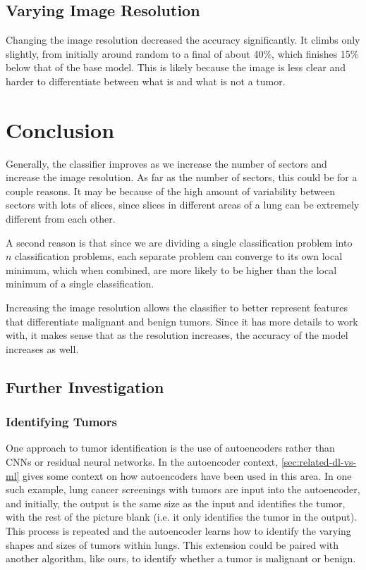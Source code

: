 \documentclass[10pt,twocolumn,letterpaper]{article}
\begin{document}
   \subsection{Varying Image Resolution} \label{sec:results-res}

		Changing the image resolution decreased the accuracy significantly. It climbs only slightly, from initially around random to a final of about 40\%, which finishes 15\% below that of the base model. This is likely because the image is less clear and harder to differentiate between what is and what is not a tumor. 

\section{Conclusion} \label{sec:conclusion}

   Generally, the classifier improves as we increase the number of sectors and increase the image resolution. As far as the number of sectors, this could be for a couple reasons. It may be because of the high amount of variability between sectors with lots of slices, since slices in different areas of a lung can be extremely different from each other. 

   A second reason is that since we are dividing a single classification problem into $n$ classification problems, each separate problem can converge to its own local minimum, which when combined, are more likely to be higher than the local minimum of a single classification. 

   Increasing the image resolution allows the classifier to better represent features that differentiate malignant and benign tumors. Since it has more details to work with, it makes sense that as the resolution increases, the accuracy of the model increases as well. 

   \subsection{Further Investigation} \label{sec:further}

      \subsubsection{Identifying Tumors} \label{sec:id-tumor}

         One approach to tumor identification is the use of autoencoders rather than CNNs or residual neural networks. In the autoencoder context, \ref{sec:related-dl-vs-ml} gives some context on how autoencoders have been used in this area. In one such example, lung cancer screenings with tumors are input into the autoencoder, and initially, the output is the same size as the input and identifies the tumor, with the rest of the picture blank (i.e. it only identifies the tumor in the output). This process is repeated and the autoencoder learns how to identify the varying shapes and sizes of tumors within lungs. This extension could be paired with another algorithm, like ours, to identify whether a tumor is malignant or benign.
\end{document}
